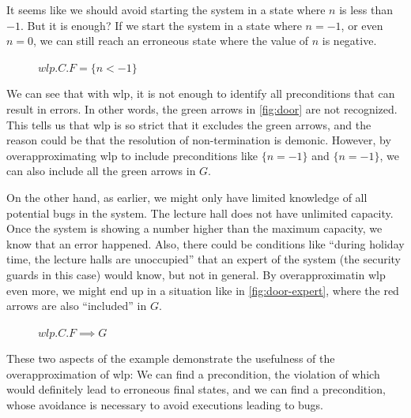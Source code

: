 It seems like we should avoid starting the system in a state where $n$ is less than $-1$. 
But it is enough? If we start the system in a state where $n=-1$, or even $n=0$, we can still reach an erroneous state where the value of $n$ is negative. 
\begin{figure}[ht]
	\centering
	
	\caption{$wlp.C.F = \{n<-1\}$}
	\label{fig:door}
\end{figure}
We can see that with wlp, it is not enough to identify all preconditions that can result in errors. 
In other words, the green arrows in \autoref{fig:door} are not recognized. 
This tells us that wlp is so strict that it excludes the green arrows, and the reason could be that the resolution of non-termination is demonic. 
However, by overapproximating wlp to include preconditions like $\{n=-1\}$ and $\{n=-1\}$, we can also include all the green arrows in $G$. 

On the other hand, as earlier, we might only have limited knowledge of all potential bugs in the system. 
The lecture hall does not have unlimited capacity. 
Once the system is showing a number higher than the maximum capacity, we know that an error happened. 
Also, there could be conditions like ``during holiday time, the lecture halls are unoccupied'' that an expert of the system (the security guards in this case) would know, but not in general. 
By overapproximatin wlp even more, we might end up in a situation like in \autoref{fig:door-expert}, where the red arrows are also ``included'' in $G$.

\begin{figure}[ht]
	\centering
	
	\caption{$wlp.C.F \implies G$}
	\label{fig:door-expert}
\end{figure}

These two aspects of the example demonstrate the usefulness of the overapproximation of wlp: We can find a precondition, the violation of which would definitely lead to erroneous final states, and we can find a precondition, whose avoidance is necessary to avoid executions leading to bugs. 




